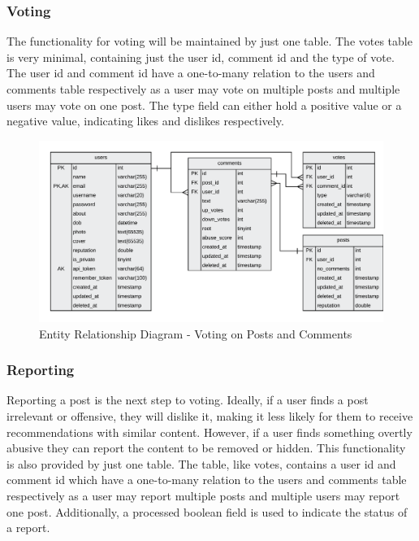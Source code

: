 \subsubsection{Voting}
The functionality for voting will be maintained by just one table. The votes table is very minimal, containing just the user id, comment id and the type of vote. The user id and comment id have a one-to-many relation to the users and comments table respectively as a user may vote on multiple posts and multiple users may vote on one post. The type field can either hold a positive value or a negative value, indicating likes and dislikes respectively.

\begin{figure}[H]
  \centering
  \includegraphics[width=1.0\textwidth]{Images/Design/Database/Votes}
  \caption{Entity Relationship Diagram - Voting on Posts and Comments} \label{fig:ERD_Voting}
\end{figure}

\subsubsection{Reporting}
Reporting a post is the next step to voting. Ideally, if a user finds a post irrelevant or offensive, they will dislike it, making it less likely for them to receive recommendations with similar content. However, if a user finds something overtly abusive they can report the content to be removed or hidden. This functionality is also provided by just one table. The table, like votes, contains a user id and comment id which have a one-to-many relation to the users and comments table respectively as a user may report multiple posts and multiple users may report one post. Additionally, a processed boolean field is used to indicate the status of a report. 

